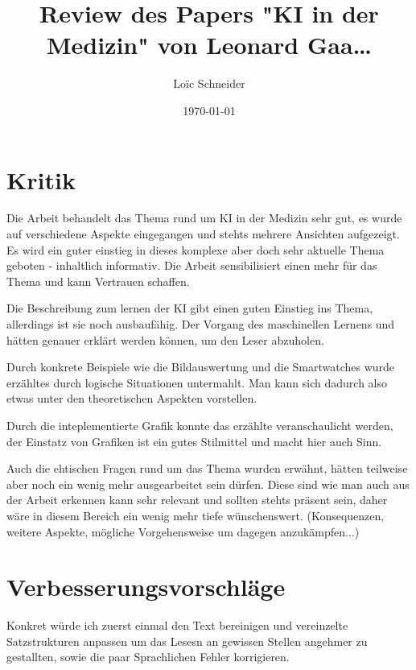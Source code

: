 \documentclass{article}
\title{Review des Papers "KI in der Medizin" von Leonard Gaa\dots}
\author{Loïc Schneider}
\date{\today}
\begin{document}
 
\pagestyle{empty}
\begin{titlepage} 
\maketitle
\thispagestyle{empty} 
\vspace{5em}

\end{titlepage}
\newpage

\section{Kritik}
Die Arbeit behandelt das Thema rund um KI in der Medizin sehr gut, es wurde auf verschiedene Aspekte eingegangen und stehts mehrere Ansichten aufgezeigt.
Es wird ein guter einstieg in dieses komplexe aber doch sehr aktuelle Thema geboten - inhaltlich informativ.
Die Arbeit sensibilisiert einen mehr für das Thema und kann Vertrauen schaffen.

Die Beschreibung zum lernen der KI gibt einen guten Einstieg ins Thema, allerdings ist sie noch ausbaufähig. Der Vorgang des maschinellen Lernens und  hätten genauer erklärt werden können, um den Leser abzuholen.

Durch konkrete Beispiele wie die Bildauswertung und die Smartwatches wurde erzähltes durch logische Situationen untermahlt. Man kann sich dadurch also etwas unter den theoretischen Aspekten vorstellen.

Durch die inteplementierte Grafik konnte das erzählte veranschaulicht werden, der Einstatz von Grafiken ist ein gutes Stilmittel und macht hier auch Sinn.

Auch die ehtischen Fragen rund um das Thema wurden erwähnt, hätten teilweise aber noch ein wenig mehr ausgearbeitet sein dürfen.
Diese sind wie man auch aus der Arbeit erkennen kann sehr relevant und sollten stehts präsent sein, daher wäre in diesem Bereich ein wenig mehr tiefe wünschenswert.
(Konsequenzen, weitere Aspekte, mögliche Vorgehensweise um dagegen anzukämpfen...)

\section{Verbesserungsvorschläge}
Konkret würde ich zuerst einmal den Text bereinigen und vereinzelte Satzstrukturen anpassen um das Lesesn an gewissen Stellen angehmer zu gestallten, sowie die paar Sprachlichen Fehler korrigieren.
\end{document}
